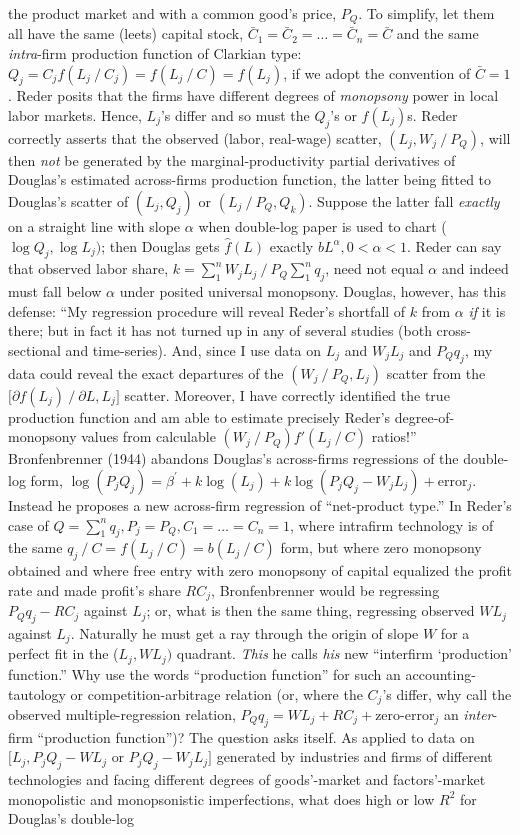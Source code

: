 \documentclass{article}
\begin{document}
{the product market and with a common good's price, \(P_Q\). To simplify, let them all have the same (leets) capital stock, \(\bar C_1=\bar C_2= \dots =\bar C_n=\bar C\) and the same \emph{intra}-firm production function of Clarkian type: \(Q_j=C_j f(L_j⁄C_j )=f(L_j⁄C)=f(L_j)\), if we adopt the convention of \(\bar C=1\). Reder posits that the firms have different degrees of \emph{monopsony} power in local labor markets. Hence, \(L_j\)'s differ and so must the \(Q_j\)'s or \(f(L_j)\)s. Reder correctly asserts that the observed (labor, real-wage) scatter, \((L_j,W_j⁄P_Q )\), will then \emph{not} be generated by the marginal-productivity partial derivatives of Douglas's estimated across-firms production function, the latter being fitted to Douglas's scatter of \((L_j, Q_j)\) or \((L_j⁄P_Q, Q_k)\). Suppose the latter fall \emph{exactly} on a straight line with slope \(\alpha\) when double-log paper is used to chart (\(\log Q_j, \log L_j)\); then Douglas gets \(\hat f(L)\) exactly \(bL^\alpha, 0<\alpha<1\). Reder can say that observed labor share, \(k=\sum_1^n W_j L_j ⁄ P_Q \sum_1^n q_j \), need not equal \(\alpha\) and indeed must fall below \(\alpha\) under posited universal monopsony. Douglas, however, has this defense: ``My regression procedure will reveal Reder's shortfall of \(k\) from \(\alpha\) \emph{if} it is there; but in fact it has not turned up in any of several studies (both cross-sectional and time-series). And, since I use data on \(L_j\) and \(W_jL_j\) and \(P_Q q_j\), my data could reveal the exact departures of the \((W_j⁄P_Q ,L_j )\) scatter from the \(\lbrack \partial f(L_j )⁄\partial L,L_j \rbrack\) scatter. Moreover, I have correctly identified the true production function and am able to estimate precisely Reder's degree-of-monopsony values from calculable \((W_j⁄P_Q )f'(L_j⁄C)\) ratios!'' Bronfenbrenner (1944) abandons Douglas's across-firms regressions of the double-log form, \(\log (P_jQ_j) =\beta^{\prime} + k\log (L_j) +k \log (P_jQ_j-W_jL_j) +\text{error}_j \). Instead he proposes a new across-firm regression of ``net-product type.'' In Reder's case of \(Q=\sum_1^n q_j , P_j=P_Q, C_1= \ldots =C_n=1\), where intrafirm technology is of the same \(q_j⁄C=f(L_j⁄C)=b(L_j⁄C)\) form, but where zero monopsony obtained and where free entry with zero monopsony of capital equalized the profit rate and made profit's share \(RC_j\), Bronfenbrenner would be regressing \(P_Q q_j-RC_j\) against \(L_j\); or, what is then the same thing, regressing observed \(WL_j\) against \(L_j\). Naturally he must get a ray through the origin of slope \(W\) for a perfect fit in the (\(L_j,WL_j)\) quadrant. \emph{This} he calls \emph{his} new ``interfirm `production' function.'' Why use the words ``production function'' for such an accounting-tautology or competition-arbitrage relation (or, where the \(C_j\)'s differ, why call the observed multiple-regression relation, \(P_Q q_j=WL_j+RC_j+\text{zero-error}_j\) an \emph{inter}-firm ``production function'')? The question asks itself. As applied to data on \(\lbrack L_j,P_jQ_j-WL_j\text{ or }P_jQ_j-W_jL_j \rbrack\) generated by industries and firms of different technologies and facing different degrees of goods'-market and factors'-market monopolistic and monopsonistic imperfections, what does high or low \(R^2\) for Douglas's double-log }
\end{document}
